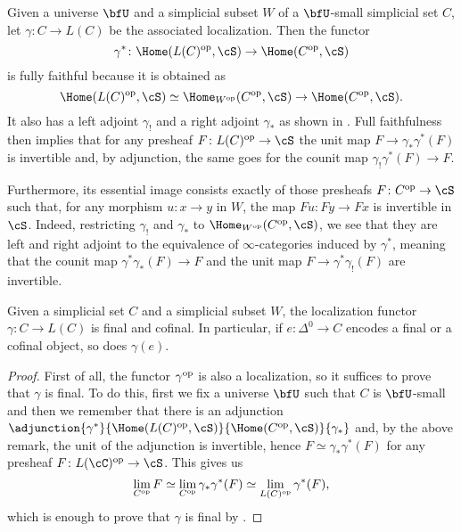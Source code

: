 \begin{rmk}

  Given a universe $\bfU$ and a simplicial subset $W$ of a $\bfU$-small
  simplicial set $C$, let $\gamma\colon C\rightarrow L(C)$ be the
  associated localization. Then the functor
  $$\gamma^*\colon\Home(L(C)^{\op},\cS)\rightarrow\Home(C^{\op},\cS)$$ is
  fully faithful because it is obtained as
  \[\Home(L(C)^{\op},\cS)\simeq\Home_{W^{\op}}(C^{\op},\cS)\rightarrow\Home(C^{\op},\cS).\]
  It also has a left adjoint $\gamma_!$ and a right adjoint $\gamma_*$ as
  shown in \cite[Ch.\ 6]{Cis19}. Full faithfulness then implies that for any
  presheaf $F\colon L(C)^{\op}\rightarrow\cS$ the unit map
  $F\rightarrow\gamma_*\gamma^*(F)$ is invertible and, by adjunction, the same
  goes for the counit map $\gamma_!\gamma^*(F)\rightarrow F$.

  Furthermore, its essential image consists exactly of those presheafs $F\colon
  C^{\op}\rightarrow\cS$ such that, for any morphism $u\colon x\rightarrow y$ in
  $W$, the map $Fu\colon Fy\rightarrow Fx$ is invertible in $\cS$. Indeed,
  restricting
  $\gamma_!$ and $\gamma_*$ to $\Home_{W^{\op}}(C^{\op},\cS)$, we see that they
  are left and right adjoint to the equivalence of $\infty$-categories induced
  by $\gamma^*$, meaning that the counit map $\gamma^*\gamma_*(F)\rightarrow F$
  and the unit map $F\rightarrow\gamma^*\gamma_!(F)$ are invertible.
\end{rmk}

\begin{prop}\label{7110}
  Given a simplicial set $C$ and a simplicial subset $W$, the localization
  functor $\gamma\colon C\rightarrow L(C)$ is final and cofinal. In
  particular, if $e\colon\Delta^0\rightarrow C$ encodes a final or a cofinal
  object, so does $\gamma(e)$.
\end{prop}
\begin{proof}
  First of all, the functor $\gamma^{\operatorname{op}}$ is also a localization, so it
  suffices to prove that $\gamma$ is final. To do this, first we fix a universe
  $\bfU$ such that $C$ is $\bfU$-small and then we remember that there
  is an adjunction
  $\adjunction{\gamma^*}{\Home(L(C)^{\op},\cS)}{\Home(C^{\op},\cS)}{\gamma_*}$
  and, by the above remark, the unit of the adjunction is invertible, hence
  $F\simeq\gamma_*\gamma^*(F)$ for any presheaf $F\colon
  L(\cC)^{\op}\rightarrow\cS$. This gives us
  \[\lim_{C^{\operatorname{op}}}F\simeq
  \lim_{C^{\operatorname{op}}}\gamma_*\gamma^*(F)\simeq
  \lim_{L(C)^{\operatorname{op}}}\gamma^*(F),\]
  which is enough to prove that $\gamma$ is final by \cite[Thm.\ 6.4.5]{Cis19}.
\end{proof}

